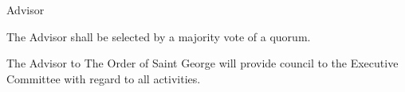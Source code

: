 {
	\begin{article}{Advisor}
		\item The Advisor shall be selected by a majority vote of a quorum.
		\item The Advisor to The Order of Saint George will provide council to the Executive Committee with regard to all activities.
	\end{article}
}